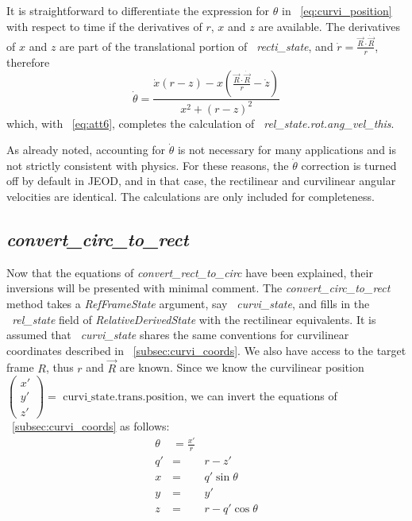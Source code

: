 It is straightforward to differentiate the expression for $\theta$ in
~\ref{eq:curvi_position} with respect to time if the derivatives of $r$, $x$
and $z$ are available. The derivatives of $x$ and $z$ are part of the
translational portion of \textit{~recti\_state},
and $\dot r = \frac{\vec{R} \cdot \dot{\vec{R}}}{r}$, therefore
\begin{equation}
\dot\theta =
\frac{\dot x(r-z)-x(\frac{\vec{R} \cdot \dot{\vec{R}}}{r}-\dot z)}{x^2 + (r-z)^2}
\label{eq:thetadot}
\end{equation}
\noindent which, with ~\ref{eq:att6}, completes the calculation of
\textit{~rel\_state.rot.ang\_vel\_this}.

As already noted, accounting for $\dot\theta$ is not necessary for many
applications and is not strictly consistent with physics. For these reasons,
the $\dot\theta$ correction is turned off by default in JEOD, and in that case, the
rectilinear and curvilinear angular velocities are identical. The calculations
are only included for completeness.

\subsection{\textit{convert\_circ\_to\_rect}}
Now that the equations of \textit{convert\_rect\_to\_circ} have been explained,
their inversions will be presented with minimal comment.  The
\textit{convert\_circ\_to\_rect} method
takes a \textit{RefFrameState} argument, say
\textit{~curvi\_state}, and fills in the \textit{~rel\_state}
field of \textit{RelativeDerivedState} with the rectilinear
equivalents. It is assumed that 
\textit{~curvi\_state} shares the same conventions for curvilinear coordinates
described in ~\ref{subsec:curvi_coords}. We also have access to the target frame $R$,
thus $r$ and $\vec R$ are known. Since we know the curvilinear position
$\left (\begin{array}{c} x' \\ y' \\ z' \end{array} \right ) =
\mbox{~curvi\_state.trans.position}$,
we can invert the equations of ~\ref{subsec:curvi_coords} as follows:
\begin{eqnarray}
\theta & = \frac{x'}{r} \\ \nonumber
q' & = & r - z' \\ \nonumber
x & = & q' \sin\theta \\ \nonumber
y & = & y' \\ \nonumber
z & = & r - q' \cos\theta
\label{eq:recti_position}
\end{eqnarray}

